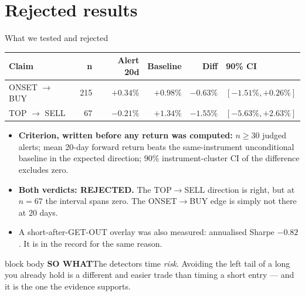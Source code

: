 \documentclass[aspectratio=169,11pt]{beamer}
\newcommand{\sowhatfont}{\footnotesize}
\newcommand{\sowhat}[1]{%
  \vspace{0.3em}
  \begin{beamercolorbox}[wd=\linewidth,sep=0.55em]{block body}
    {\sowhatfont\textbf{\color{gicnavy}SO WHAT}\quad #1}
  \end{beamercolorbox}}
\begin{document}
\section{Rejected results}
\begin{frame}{What we tested and rejected}
  \small
  \begin{table}
    \begin{tabular}{@{}lrrrrl@{}}
      \toprule
      \textbf{Claim} & \textbf{n} & \textbf{Alert 20d} & \textbf{Baseline}
      & \textbf{Diff} & \textbf{90\% CI} \\
      \midrule
      ONSET $\rightarrow$ BUY  & 215 & $+0.34\%$ & $+0.98\%$ & $-0.63\%$
        & $[-1.51\%, +0.26\%]$ \\
      TOP $\rightarrow$ SELL   & 67  & $-0.21\%$ & $+1.34\%$ & $-1.55\%$
        & $[-5.63\%, +2.63\%]$ \\
      \bottomrule
    \end{tabular}
  \end{table}
  \vspace{0.3em}
  \begin{itemize}\footnotesize
    \item \textbf{Criterion, written before any return was computed:}
      $n \geq 30$ judged alerts; mean 20-day forward return beats the
      same-instrument unconditional baseline in the expected direction; 90\%
      instrument-cluster CI of the difference excludes zero.
    \item \textbf{Both verdicts: REJECTED.} The TOP$\rightarrow$SELL direction
      is right, but at $n=67$ the interval spans zero. The
      ONSET$\rightarrow$BUY edge is simply not there at 20 days.
    \item A short-after-GET-OUT overlay was also measured: annualised Sharpe
      $-0.82$. It is in the record for the same reason.
  \end{itemize}
  \sowhat{The detectors time \emph{risk}. Avoiding the left tail of a long you
    already hold is a different and easier trade than timing a short entry ---
    and it is the one the evidence supports.}
\end{frame}
\end{document}
